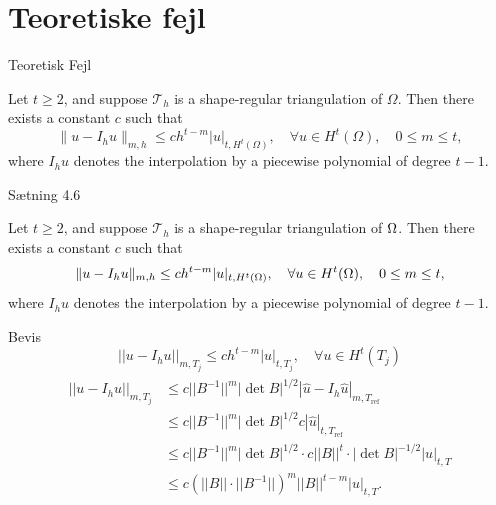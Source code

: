 \section{Teoretiske fejl}
\begin{frame}{Teoretisk Fejl}
\begin{theorem}
    Let $t \geq 2$, and suppose $\mathcal{T}_h$ is a shape-regular triangulation of $\Omega$. Then there exists a constant $c$ such that
    \begin{equation*}
        \|u - I_h u\|_{m,h} \leq c h^{t-m} |u|_{t, H^t(\Omega)}, \quad \forall u \in H^t(\Omega), \quad 0 \leq m \leq t,
    \end{equation*}
    where $I_h u$ denotes the interpolation by a piecewise polynomial of degree $t-1$.
\end{theorem}
\end{frame}
\iffalse
\begin{frame}{Sætning 4.6}{}
    \begin{theorem}
    Let $t \geq 2$, and suppose $\mathcal{T}_h$ is a shape-regular triangulation of $\Omega$. Then there exists a constant $c$ such that
    \begin{equation}
        \|u - I_h u\| _{m,h} \leq c h^{t-m} |u|_{t, H^t(\Omega)}, \quad \forall u \in H^t(\Omega), \quad 0 \leq m \leq t,
    \end{equation}
    where $I_h u$ denotes the interpolation by a piecewise polynomial of degree $t-1$.
    \end{theorem}
\end{frame}
\begin{frame}{Bevis}
    \begin{equation}
        ||u-I_h u||_{m,T_j} \leq c h^{t-m} |u|_{t,T_j}, \quad \forall u \in H^t(T_j)
    \end{equation}
    \begin{align}
        \begin{split}
        ||u-I_h u||_{m,T_j} &\leq c ||B^{-1}||^m |\det B |^{1/2} |\hat{u} - I_h \hat{u}|_{m,T_{\text{ref}}} \\
                            &\leq c ||B^{-1}||^m |\det B |^{1/2} c | \hat{u} |_{t,T_{\text{ref}}} \\
                            &\leq c ||B^{-1}||^m |\det B |^{1/2} \cdot c ||B||^t \cdot |\det B |^{-1/2} |u|_{t,T}  \\
                         &\leq c {\left( ||B||  \cdot ||B^{-1}|| \right)}^m ||B||^{t-m} |u|_{t,T}.
        \end{split}
    \end{align}
\end{frame}
